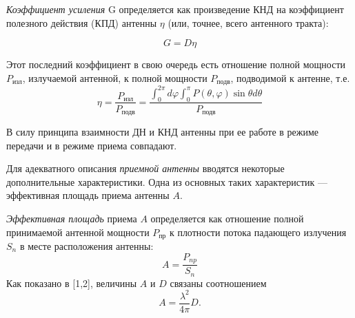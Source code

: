 

\textit{Коэффициент усиления} G определяется как произведение КНД на коэффициент полезного действия (КПД) антенны $\eta$
(или, точнее, всего антенного тракта):

\begin{equation}
    G = D\eta
    \label{eq:3}    
\end{equation}

Этот последний коэффициент в свою очередь есть отношение полной мощности $P_{\text{изл}}$, излучаемой антенной, к полной
мощности $P_{\text{подв}}$, подводимой к антенне, т.е.
\begin{equation}
    \eta =\frac{P_{\text{изл}}}{P_{\text{подв}}} = \frac{\int_{0}^{2 \pi} d \varphi \int_{0}^{\pi} P(\theta, \varphi) \sin \theta d \theta}{P_{\text{подв}}}
    \label{eq:4}    
\end{equation}

В силу принципа взаимности ДН и КНД антенны при ее работе в режиме передачи и в режиме приема совпадают.

Для адекватного описания \textit{приемной антенны} вводятся некоторые дополнительные характеристики. 
Одна из основных таких характеристик — эффективная площадь приема антенны $A$.

\textit{Эффективная площадь} приема $A$ определяется как отношение полной принимаемой антенной мощности 
$P_{\text{пр}}$ к плотности потока падающего
излучения $S_n$ в месте расположения антенны:
\begin{equation}
    A = \frac{P_{np}}{S_n}
    \label{eq:5}
\end{equation}
Как показано в [1,2], величины $A$ и $D$ связаны соотношением
\begin{equation}
    A = \frac{\lambda^2}{4\pi}D.
    \label{eq:6}
\end{equation}


